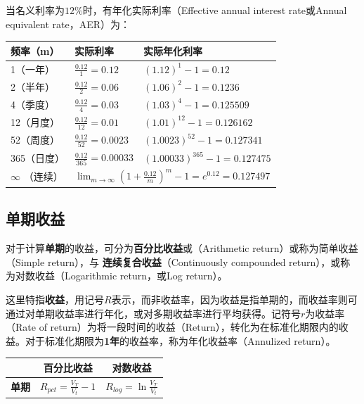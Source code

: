 \documentclass[11pt]{article}
\begin{document}
\begin{example}
    当名义利率为$12\%$时，有年化实际利率（Effective annual interest rate或Annual equivalent rate，AER）为：
    \begin{table}[H]
    \centering
    \begin{tabular}{@{}lll@{}}
    \toprule
    频率（m） & 实际利率 & 实际年化利率 \\ \midrule
    1（一年）   & $\frac{0.12}{1}=0.12$  & $(1.12)^1-1=0.12$ \\
    2（半年）   & $\frac{0.12}{2}=0.06$  & $(1.06)^2-1=0.1236$      \\
    4（季度）   & $\frac{0.12}{4}=0.03$  & $(1.03)^4-1=0.125509$       \\
    12（月度）  & $\frac{0.12}{12}=0.01$ & $(1.01)^{12}-1=0.126162$ \\
    52（周度）  & $\frac{0.12}{52}=0.0023$  & $(1.0023)^{52}-1=0.127341$\\
    365（日度） & $\frac{0.12}{365}=0.00033$ & $(1.00033)^365-1=0.127475$ \\
    $\infty$ （连续）  & \multicolumn{2}{l}{$ \lim_{m \rightarrow \infty} (1+\frac{0.12}{m})^{m} - 1 = e^{0.12} = 0.127497
    $}            \\ \bottomrule
    \end{tabular}
    \end{table}
\end{example}

\subsection{单期收益}

对于计算\textbf{单期}的收益，可分为\textbf{百分比收益}或（Arithmetic return）或称为简单收益（Simple return），与
\textbf{连续复合收益}（Continuously compounded return），或称为对数收益（Logarithmic return，或Log return）。

这里特指\textbf{收益}，用记号$R$表示，而非收益率，因为收益是指单期的，而收益率则可通过对单期收益率进行年化，或对多期收益率进行平均获得。记符号$r$为收益率（Rate of return）为将一段时间的收益（Return），转化为在标准化期限内的收益。对于标准化期限为\textbf{1年}的收益率，称为年化收益率（Annulized return）。
\begin{table}[H]
\centering
\begin{tabular}{@{}cll@{}}
\toprule
\multicolumn{1}{l}{}
& \multicolumn{1}{c}{\textbf{百分比收益}} & \multicolumn{1}{c}{\textbf{对数收益}} \\
\midrule
\multirow{1}{*}{\textbf{单期}} 
& $R_{pct} = \frac{V_T}{V_t}-1$
& $R_{log} = \ln \frac{V_T}{V_t}$ \\
\bottomrule
\end{tabular}
\end{table}
\end{document}

